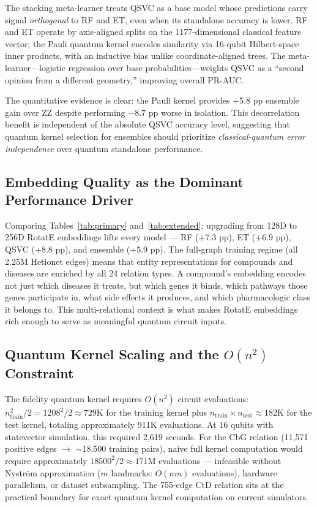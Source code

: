 \documentclass[twocolumn,10pt]{article}
\begin{document}
The stacking meta-learner treats QSVC as a base model whose predictions carry signal \textit{orthogonal} to RF and ET, even when its standalone accuracy is lower. RF and ET operate by axis-aligned splits on the 1177-dimensional classical feature vector; the Pauli quantum kernel encodes similarity via 16-qubit Hilbert-space inner products, with an inductive bias unlike coordinate-aligned trees. The meta-learner---logistic regression over base probabilities---weights QSVC as a ``second opinion from a different geometry,'' improving overall PR-AUC.

The quantitative evidence is clear: the Pauli kernel provides +5.8 pp ensemble gain over ZZ despite performing $-8.7$ pp worse in isolation. This decorrelation benefit is independent of the absolute QSVC accuracy level, suggesting that quantum kernel selection for ensembles should prioritize \textit{classical-quantum error independence} over quantum standalone performance.

\subsection{Embedding Quality as the Dominant Performance Driver}

Comparing Tables~\ref{tab:primary} and~\ref{tab:extended}: upgrading from 128D to 256D RotatE embeddings lifts every model --- RF (+7.3 pp), ET (+6.9 pp), QSVC (+8.8 pp), and ensemble (+5.9 pp). The full-graph training regime (all 2.25M Hetionet edges) means that entity representations for compounds and diseases are enriched by all 24 relation types. A compound's embedding encodes not just which diseases it treats, but which genes it binds, which pathways those genes participate in, what side effects it produces, and which pharmacologic class it belongs to. This multi-relational context is what makes RotatE embeddings rich enough to serve as meaningful quantum circuit inputs.

\subsection{Quantum Kernel Scaling and the \texorpdfstring{$O(n^2)$}{O(n-squared)} Constraint}

The fidelity quantum kernel requires $O(n^2)$ circuit evaluations: $n_{\text{train}}^2 / 2 = 1208^2/2 \approx 729\text{K}$ for the training kernel plus $n_{\text{train}} \times n_{\text{test}} \approx 182\text{K}$ for the test kernel, totaling approximately 911K evaluations. At 16 qubits with statevector simulation, this required 2,619 seconds. For the CbG relation (11,571 positive edges $\to$ ${\sim}$18,500 training pairs), naive full kernel computation would require approximately $18500^2/2 \approx 171\text{M}$ evaluations --- infeasible without Nystr\"{o}m approximation ($m$ landmarks: $O(nm)$ evaluations), hardware parallelism, or dataset subsampling. The 755-edge CtD relation sits at the practical boundary for exact quantum kernel computation on current simulators.
\end{document}
